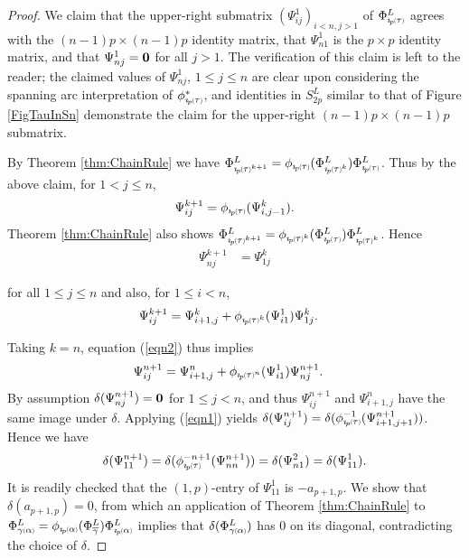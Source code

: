 \documentclass[11pt]{amsart}
\newcommand*{\subsmallp}[1]{\scalebox{.5}{\ensuremath#1}}
\newcommand{\subpp}[2][p]{\imath_{\hspace*{-1pt}#1}\hspace*{-.5pt}\subsmallp(#2\subsmallp)}
\newcommand{\al}[1]{\begin{align*}#1\end{align*}}
\newtheorem{lem}[thm]{Lemma}
\theoremstyle{definition}
\begin{document}
\begin{proof}

We claim that the upper-right submatrix $(\Psi_{ij}^1)_{i<n,j>1}$ of $\Phi_{\subpp\tau}^L$ agrees with the $(n-1)p \times (n-1)p$ identity matrix, that $\Psi_{n1}^1$ is the $p\times p$ identity matrix, and that $\Psi_{nj}^1={\bf 0}$ for all $j>1$. The verification of this claim is left to the reader; the claimed values of $\Psi_{nj}^1$, $1\le j\le n$ are clear upon considering the spanning arc interpretation of $\phi_{\subpp\tau}^*$, and identities in $S_{2p}^L$ similar to that of Figure \ref{FigTauInSn} demonstrate the claim for the upper-right $(n-1)p \times (n-1)p$ submatrix.

By Theorem \ref{thm:ChainRule} we have $\Phi_{\subpp\tau^{k+1}}^L = \phi_{\subpp\tau}(\Phi_{\subpp\tau^{k}}^L)\Phi_{\subpp\tau}^L$. Thus by the above claim, for $1<j\le n$,
  \begin{equation}
    \Psi_{ij}^{k+1} = \phi_{\subpp\tau}(\Psi_{i,j-1}^k).
    \label{eqn1}
  \end{equation}
Theorem \ref{thm:ChainRule} also shows $\Phi_{\subpp\tau^{k+1}}^L = \phi_{\subpp\tau^k}(\Phi_{\subpp\tau}^L)\Phi_{\subpp\tau^k}^L$. Hence
  \begin{equation}
    \begin{aligned}
      \Psi_{nj}^{k+1}  &= \Psi_{1j}^k
    \end{aligned}
    \label{eqn2}
  \end{equation}
  
for all $1\le j\le n$ and also, for $1\le i < n$,
  \al{
    \Psi_{ij}^{k+1} &= \Psi_{i+1,j}^k + \phi_{\subpp\tau^k}(\Psi_{i1}^1)\Psi_{1j}^k.
  }

Taking $k=n$, equation (\ref{eqn2}) thus implies
  \al{
    \Psi_{ij}^{n+1} &= \Psi_{i+1,j}^n + \phi_{\subpp\tau^n}(\Psi_{i1}^1)\Psi_{nj}^{n+1}.
  }
By assumption $\delta(\Psi_{nj}^{n+1})={\bf 0}$ for $1\le j < n$, and thus $\Psi_{ij}^{n+1}$ and $\Psi_{i+1,j}^n$ have the same image under $\delta$. Applying (\ref{eqn1}) yields $\delta(\Psi_{ij}^{n+1}) = \delta(\phi_{\subpp\tau}^{-1}(\Psi_{i+1,j+1}^{n+1}))$. Hence we have
    \[\delta(\Psi_{11}^{n+1}) = \delta(\phi_{\subpp\tau}^{-n+1}(\Psi_{nn}^{n+1})) = \delta(\Psi_{n1}^2) = \delta(\Psi_{11}^1).\]
It is readily checked that the $(1,p)$-entry of $\Psi_{11}^1$ is $-a_{p+1,p}$. We show that $\delta(a_{p+1,p})=0$, from which an application of Theorem \ref{thm:ChainRule} to $\Phi_{\gamma\subsmallp(\alpha\subsmallp)}^L = \phi_{\subpp\alpha}(\Phi_{\overline\gamma}^L)\Phi_{\subpp\alpha}^L$ implies that $\delta(\Phi_{\gamma\subsmallp(\alpha\subsmallp)}^L)$ has 0 on its diagonal, contradicting the choice of $\delta$.


\end{proof}
\end{document}
